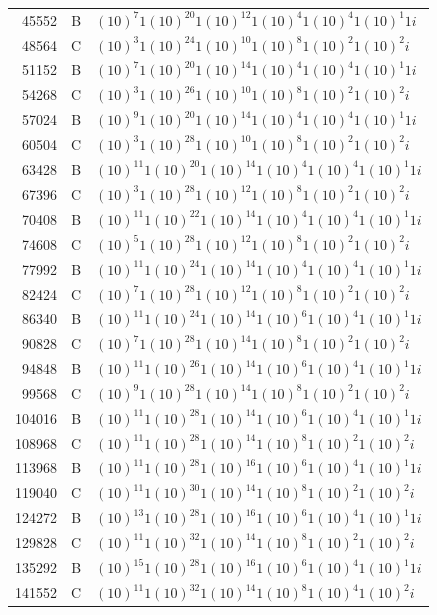\documentclass[12pt]{article}
\begin{document}
\begin{table}[H]
\begin{Parallel}[c]{0.48\textwidth}{0.48\textwidth}
{{\begin{scriptsize}
\begin{tabular}{rrl}
45552&B&$(10)^{7}1(10)^{20}1(10)^{12}1(10)^{4}1(10)^{4}1(10)^{1}1i$\\
48564&C&$(10)^{3}1(10)^{24}1(10)^{10}1(10)^{8}1(10)^{2}1(10)^{2}i$\\
51152&B&$(10)^{7}1(10)^{20}1(10)^{14}1(10)^{4}1(10)^{4}1(10)^{1}1i$\\
54268&C&$(10)^{3}1(10)^{26}1(10)^{10}1(10)^{8}1(10)^{2}1(10)^{2}i$\\
57024&B&$(10)^{9}1(10)^{20}1(10)^{14}1(10)^{4}1(10)^{4}1(10)^{1}1i$\\
60504&C&$(10)^{3}1(10)^{28}1(10)^{10}1(10)^{8}1(10)^{2}1(10)^{2}i$\\
63428&B&$(10)^{11}1(10)^{20}1(10)^{14}1(10)^{4}1(10)^{4}1(10)^{1}1i$\\
67396&C&$(10)^{3}1(10)^{28}1(10)^{12}1(10)^{8}1(10)^{2}1(10)^{2}i$\\
70408&B&$(10)^{11}1(10)^{22}1(10)^{14}1(10)^{4}1(10)^{4}1(10)^{1}1i$\\
74608&C&$(10)^{5}1(10)^{28}1(10)^{12}1(10)^{8}1(10)^{2}1(10)^{2}i$\\
77992&B&$(10)^{11}1(10)^{24}1(10)^{14}1(10)^{4}1(10)^{4}1(10)^{1}1i$\\
82424&C&$(10)^{7}1(10)^{28}1(10)^{12}1(10)^{8}1(10)^{2}1(10)^{2}i$\\
86340&B&$(10)^{11}1(10)^{24}1(10)^{14}1(10)^{6}1(10)^{4}1(10)^{1}1i$\\
90828&C&$(10)^{7}1(10)^{28}1(10)^{14}1(10)^{8}1(10)^{2}1(10)^{2}i$\\
94848&B&$(10)^{11}1(10)^{26}1(10)^{14}1(10)^{6}1(10)^{4}1(10)^{1}1i$\\
99568&C&$(10)^{9}1(10)^{28}1(10)^{14}1(10)^{8}1(10)^{2}1(10)^{2}i$\\
104016&B&$(10)^{11}1(10)^{28}1(10)^{14}1(10)^{6}1(10)^{4}1(10)^{1}1i$\\
108968&C&$(10)^{11}1(10)^{28}1(10)^{14}1(10)^{8}1(10)^{2}1(10)^{2}i$\\
113968&B&$(10)^{11}1(10)^{28}1(10)^{16}1(10)^{6}1(10)^{4}1(10)^{1}1i$\\
119040&C&$(10)^{11}1(10)^{30}1(10)^{14}1(10)^{8}1(10)^{2}1(10)^{2}i$\\
124272&B&$(10)^{13}1(10)^{28}1(10)^{16}1(10)^{6}1(10)^{4}1(10)^{1}1i$\\
129828&C&$(10)^{11}1(10)^{32}1(10)^{14}1(10)^{8}1(10)^{2}1(10)^{2}i$\\
135292&B&$(10)^{15}1(10)^{28}1(10)^{16}1(10)^{6}1(10)^{4}1(10)^{1}1i$\\
141552&C&$(10)^{11}1(10)^{32}1(10)^{14}1(10)^{8}1(10)^{4}1(10)^{2}i$\\

\end{tabular}
\end{scriptsize}}}
\end{Parallel}
\end{table}
\end{document}
